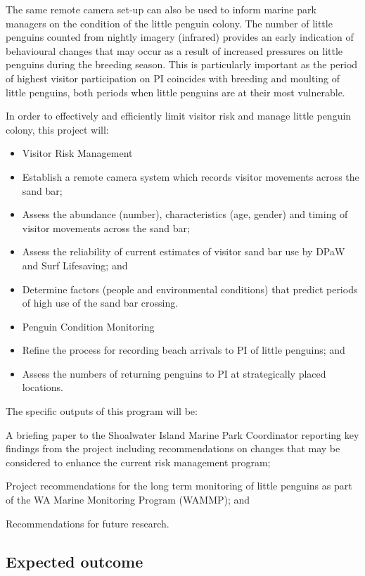 \documentclass[version=last,
    paper=a4,                               %
    10pt,                                   %
    dvipsnames,
    oneside,                              %
    headings=openany,                       %
    open=any,
    BCOR=7mm,                               %
    DIV=15,     %
]{scrbook}
\begin{document}
The same remote camera set-up can also be used to inform marine park
managers on the condition of the little penguin colony. The number of
little penguins counted from nightly imagery (infrared) provides an
early indication of behavioural changes that may occur as a result of
increased pressures on little penguins during the breeding season. This
is particularly important as the period of highest visitor participation
on PI coincides with breeding and moulting of little penguins, both
periods when little penguins are at their most vulnerable.

In order to effectively and efficiently limit visitor risk and manage
little penguin colony, this project will:

\begin{itemize}
\itemsep1pt\parskip0pt
\item
  Visitor Risk Management
\item
  Establish a remote camera system which records visitor movements
  across the sand bar;
\item
  Assess the abundance (number), characteristics (age, gender) and
  timing of visitor movements across the sand bar;
\item
  Assess the reliability of current estimates of visitor sand bar use by
  DPaW and Surf Lifesaving; and
\item
  Determine factors (people and environmental conditions) that predict
  periods of high use of the sand bar crossing.
\item
  Penguin Condition Monitoring
\item
  Refine the process for recording beach arrivals to PI of little
  penguins; and
\item
  Assess the numbers of returning penguins to PI at strategically placed
  locations.
\end{itemize}

The specific outputs of this program will be:

A briefing paper to the Shoalwater Island Marine Park Coordinator
reporting key findings from the project including recommendations on
changes that may be considered to enhance the current risk management
program;

Project recommendations for the long term monitoring of little penguins
as part of the WA Marine Monitoring Program (WAMMP); and

Recommendations for future research.




\subsection*{Expected outcome}
\end{document}
